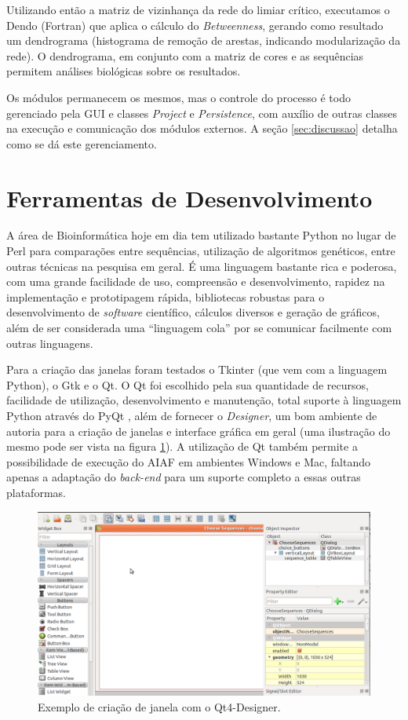 Utilizando então a matriz de vizinhança da rede do limiar crítico, executamos o Dendo (Fortran) que aplica o cálculo do \textit{Betweenness}, gerando como
resultado um dendrograma (histograma de remoção de arestas, indicando modularização da rede). O dendrograma, em conjunto com a matriz de cores e as sequências
permitem análises biológicas sobre os resultados.

Os módulos permanecem os mesmos, mas o controle do processo é todo gerenciado pela GUI e classes \textit{Project} e \textit{Persistence}, com auxílio de
outras classes na execução e comunicação dos módulos externos. A seção \ref{sec:discussao} detalha como se dá este gerenciamento.

\section{Ferramentas de Desenvolvimento} \label{sec:ferramentas}

A área de Bioinformática hoje em dia tem utilizado bastante Python \cite{python} no lugar de Perl para comparações entre sequências, utilização de algoritmos
genéticos, entre outras técnicas na pesquisa em geral. É uma linguagem bastante rica e poderosa, com uma grande facilidade de uso, compreensão e
desenvolvimento, rapidez na implementação e prototipagem rápida, bibliotecas robustas para o desenvolvimento de \textit{software} científico, cálculos
diversos e geração de gráficos, além de ser considerada uma ``linguagem cola'' por se comunicar facilmente com outras linguagens.

Para a criação das janelas foram testados o Tkinter (que vem com a linguagem Python), o Gtk e o Qt. O Qt foi escolhido pela sua quantidade de recursos,
facilidade de utilização, desenvolvimento e manutenção, total suporte à linguagem Python através do PyQt \cite{pyqt}, além de fornecer o \textit{Designer},
um bom ambiente de autoria para a criação de janelas e interface gráfica em geral (uma ilustração do mesmo pode ser vista na figura \ref{fig:designer}).
A utilização de Qt também permite a possibilidade de execução do AIAF em ambientes Windows e Mac, faltando apenas a adaptação do \textit{back-end} para um
suporte completo a essas outras plataformas.

\begin{figure}
\centering
\includegraphics[scale=0.38]{designer}
\caption{Exemplo de criação de janela com o Qt4-Designer.}
\label{fig:designer}
\end{figure}

